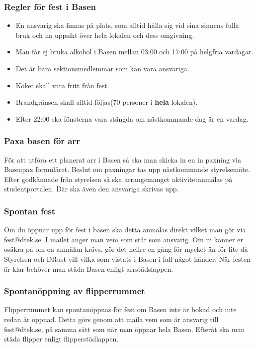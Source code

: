 \documentclass[a4paper]{dtek}
\begin{document}
\subsubsection{Regler för fest i Basen}
\begin{itemize}
    \item En ansvarig ska finnas på plats, som alltid hålla sig vid sina sinnens fulla bruk och ha uppsikt över hela lokalen och dess omgivning.
    \item Man får ej bruka alkohol i Basen mellan 03:00 och 17:00 på helgfria vardagar.
    \item Det är bara sektionsmedlemmar som kan vara ansvariga.
    \item Köket skall vara fritt från fest.
    \item Brandgränsen skall alltid följas(70 personer i \textbf{hela} lokalen).
    \item Efter 22:00 ska fönsterna vara stängda om nästkommande dag är en vardag.
\end{itemize}

\subsubsection{Paxa basen för arr}
För att utföra ett planerat arr i Basen så ska man skicka in en in paxning via Basenpax formuläret. Beslut om paxningar tas upp nästkommande styrelsemöte.
Efter godkännade från styrelsen så ska arrangemanget aktivitetanmälas på studentportalen. Där ska även den ansvariga skrivas upp.

\subsubsection{Spontan fest}
Om du öppnar upp för fest i basen ska detta anmälas direkt vilket man gör via fest@dtek.se.
I mailet anger man vem som står som ansvarig. Om ni känner er osäkra på om en anmälan
krävs, gör det hellre en gång för mycket än för lite då Styrelsen och DRust vill vilka som
vistats i Basen i fall något händer. 
När festen är klar behöver man städa Basen enligt arrstädslappen.

\subsubsection{Spontanöppning av flipperrummet}
Flipperrummet kan spontanöppnas för fest om Basen inte är bokad och inte redan är öppnad.
Detta görs genom att maila vem som är ansvarig till fest@dtek.se, på samma sätt som när man öppnar hela Basen.
Efteråt ska man städa flipper enligt flipperstädlappen.
\end{document}
